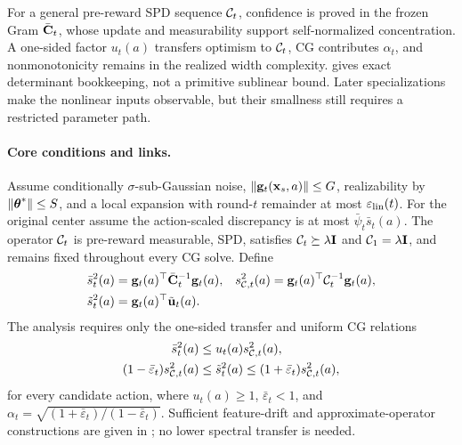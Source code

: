 For a general pre-reward SPD sequence $\mathcal{C}_t$, confidence is proved in the
frozen Gram $\bar{\mathbf{C}}_t$, whose update and measurability support self-normalized
concentration.  A one-sided factor $u_t(a)$ transfers optimism to $\mathcal{C}_t$,
CG contributes $\alpha_t$, and nonmonotonicity remains in the realized width
complexity.   gives exact determinant bookkeeping,
not a primitive sublinear bound.  Later specializations make the nonlinear
inputs observable, but their smallness still requires a restricted parameter
path.

\paragraph{Core conditions and links.}
Assume conditionally $\sigma$-sub-Gaussian noise, $\|\mathbf{g}_t(\mathbf{x}_s,a)\|\le G$,
realizability by $\|\boldsymbol{\theta}^*\|\le S$, and a local expansion with round-$t$
remainder at most $\varepsilon_{\mathrm{lin}}(t)$.  For the original center assume the
action-scaled discrepancy is at most $\bar\psi_t\bar s_t(a)$.  The operator
$\mathcal{C}_t$ is pre-reward measurable, SPD, satisfies $\mathcal{C}_t\succeq\lambda\mathbf{I}$ and
$\mathcal{C}_1=\lambda\mathbf{I}$, and remains fixed throughout every CG solve.  Define
\begin{equation}\label{eq:main-widths}
\begin{aligned}
 \bar s_t^2(a)&=\mathbf{g}_t(a)^\top\bar{\mathbf{C}}_t^{-1}\mathbf{g}_t(a),&
 s_{\mathcal{C},t}^2(a)&=\mathbf{g}_t(a)^\top\mathcal{C}_t^{-1}\mathbf{g}_t(a),\\
 \tilde s_t^2(a)&=\mathbf{g}_t(a)^\top\tilde{\mathbf{u}}_t(a).&&
\end{aligned}
\end{equation}
The analysis requires only the one-sided transfer and uniform CG relations
\begin{equation}\label{eq:main-transfer-cg}
\begin{aligned}
 \bar s_t^2(a)&\le u_t(a)s_{\mathcal{C},t}^2(a),\\
 (1-\bar\varepsilon_t)s_{\mathcal{C},t}^2(a)&\le\tilde s_t^2(a)
 \le(1+\bar\varepsilon_t)s_{\mathcal{C},t}^2(a),
\end{aligned}
\end{equation}
for every candidate action, where $u_t(a)\ge1$, $\bar\varepsilon_t<1$, and
$\alpha_t=\sqrt{(1+\bar\varepsilon_t)/(1-\bar\varepsilon_t)}$.  Sufficient
feature-drift and approximate-operator constructions are given in
; no lower spectral transfer is
needed.

